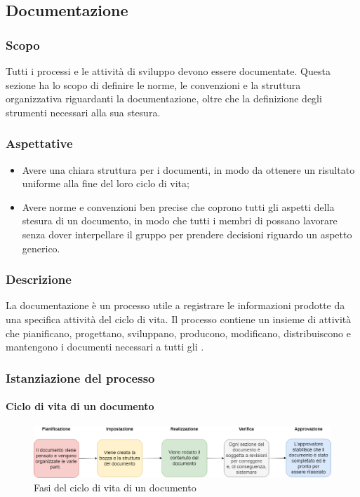 \subsection{Documentazione}
\subsubsection{Scopo}
Tutti i processi e le attività di sviluppo devono essere documentate. Questa sezione ha lo scopo di definire le norme, le convenzioni e la struttura organizzativa riguardanti la documentazione, oltre che la definizione degli strumenti necessari alla sua stesura.
\subsubsection{Aspettative}
\begin{itemize}
	\item Avere una chiara struttura per i documenti, in modo da ottenere un risultato uniforme alla fine del loro ciclo di vita;	
	\item Avere norme e convenzioni ben precise che coprono tutti gli aspetti della stesura di un documento, in modo che tutti i membri di \Gruppo{} possano lavorare senza dover interpellare il gruppo per prendere decisioni riguardo un aspetto generico.
\end{itemize}
\subsubsection{Descrizione}
La documentazione è un processo utile a registrare le informazioni prodotte da una specifica attività del ciclo di vita. Il processo contiene un insieme di attività che pianificano, progettano, sviluppano, producono, modificano, distribuiscono e mantengono i documenti necessari a tutti gli .
\subsubsection{Istanziazione del processo}
\paragraph{Ciclo di vita di un documento}
\begin{figure}[!htb]
     \centering
     \includegraphics[scale=0.45]{Images/DocumentLifeCycle.png}
     \caption{Fasi del ciclo di vita di un documento}
\end{figure}

